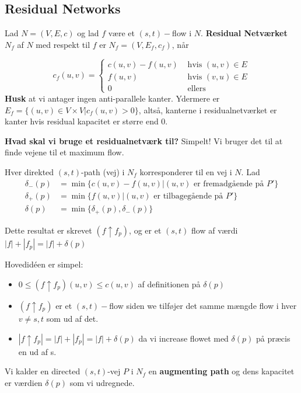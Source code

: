 \documentclass[11pt]{article}
\theoremstyle{definition}
\theoremstyle{remark}
\begin{document}
\subsection{Residual Networks}
\label{subsec:residual}

Lad $N = (V,E,c)$ og lad $f$ være et $(s,t)-$flow i $N$. \textbf{Residual Netværket} $N_{f}$ af $N$ med respekt til $f$ er $N_{f} = (V, E_f, c_{f})$, når

\[
c_{f}(u,v) = \begin{cases}
  c(u,v) - f(u,v) & \text{ hvis } (u,v) \in E\\
  f(u,v) & \text{ hvis }(v,u) \in E\\
  0 & \text{ ellers}
\end{cases}
\]
\textbf{Husk} at vi antager ingen anti-parallele kanter. 
Ydermere er $E_{f} = \{(u,v) \in V \times V | c_{f}(u,v) > 0\}$, altså, kanterne i residualnetværket er kanter hvis residual kapacitet er større end 0.

\textbf{Hvad skal vi bruge et residualnetværk til?} Simpelt! Vi bruger det til at finde vejene til et maximum flow.


Hver direkted $(s,t)$-path (vej) i $N_{f}$ korresponderer til en vej i $N$. 
Lad
\begin{equation}
  \begin{split}
  \delta_{-}(p) &= \min \{c(u,v) - f(u,v) | (u,v) \text{ er fremadgående på } P'\}\\
  \delta_{+}(p) &= \min\{ f(u,v) | (u,v) \text{ er tilbagegående på } P'\}\\
  \delta(p) &= \min\{ \delta_{+}(p), \delta_{-}(p)\}
  \end{split}
\end{equation}

Dette resultat er skrevet $(f \uparrow f_{p})$, og er et $(s,t)$ flow af værdi $|f| + |f_{p}| = |f| + \delta(p)$

Hovedidéen er simpel:
\begin{itemize}
\item $0 \leq (f \uparrow f_{p})(u,v) \leq c(u,v) $ af definitionen på $\delta(p)$
\item $(f \uparrow f_{p}) $ er et $(s,t)-$flow siden we tilføjer det samme mængde flow i hver $v \neq s,t$ som ud af det. 
\item $|f \uparrow f_{p}| = |f| + |f_{p}| = |f| + \delta(p)$ da vi increase flowet med $\delta(p)$ på præcis en ud af s.
\end{itemize}

Vi kalder en directed $(s,t)$-vej $P$ i $N_{f}$ en \textbf{augmenting path} og dens kapacitet er værdien $\delta(p)$ som vi udregnede. 
\end{document}
